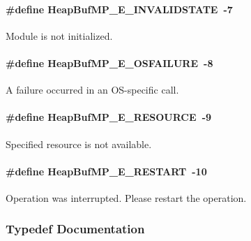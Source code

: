 \paragraph[{HeapBufMP\_\-E\_\-INVALIDSTATE}]{\setlength{\rightskip}{0pt plus 5cm}\#define HeapBufMP\_\-E\_\-INVALIDSTATE~-\/7}\hfill\label{_heap_buf_m_p_8h_a72fbd9726f36a122c3462ab151e67518}


Module is not initialized. 

\paragraph[{HeapBufMP\_\-E\_\-OSFAILURE}]{\setlength{\rightskip}{0pt plus 5cm}\#define HeapBufMP\_\-E\_\-OSFAILURE~-\/8}\hfill\label{_heap_buf_m_p_8h_a7b0421d7bd809415074b1483f044162f}


A failure occurred in an OS-\/specific call. 

\paragraph[{HeapBufMP\_\-E\_\-RESOURCE}]{\setlength{\rightskip}{0pt plus 5cm}\#define HeapBufMP\_\-E\_\-RESOURCE~-\/9}\hfill\label{_heap_buf_m_p_8h_a7354bfdbab3d4d028d0c6d48edd308a7}


Specified resource is not available. 

\paragraph[{HeapBufMP\_\-E\_\-RESTART}]{\setlength{\rightskip}{0pt plus 5cm}\#define HeapBufMP\_\-E\_\-RESTART~-\/10}\hfill\label{_heap_buf_m_p_8h_a445c7db0d4aa1939dc33cefe24f6c4df}


Operation was interrupted. Please restart the operation. 



\subsubsection{Typedef Documentation}
